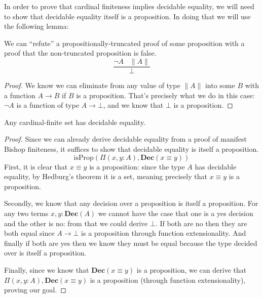 In order to prove that cardinal finiteness implies decidable equality, we will
need to show that decidable equality itself is a proposition.
In doing that we will use the following lemma:
\begin{lemma} \label{prop-refute}
  We can ``refute'' a propositionally-truncated proof of some proposition with a
  proof that the non-truncated proposition is false.
  \begin{equation}
    \frac{\neg A \; \; \; \lVert A \rVert}{\bot}
  \end{equation}
\end{lemma}
\begin{proof}
  We know we can eliminate from any value of type \(\lVert A \rVert\) into some
  \(B\) with a function \(A \to B\) if \(B\) is a proposition.
  That's precisely what we do in this case: \(\neg A\) is a function of type \(A
  \to \bot\), and we know that \(\bot\) is a proposition.
\end{proof}

\begin{lemma} \label{cardinal-finite-discrete}
  Any cardinal-finite set has decidable equality.
\end{lemma}
\begin{proof}
  Since we can already derive decidable equality from a proof of manifest Bishop
  finiteness, it suffices to show that decidable equality is itself a
  proposition.
  \begin{equation}
    \text{isProp}(\Pi(x, y : A) , \mathbf{Dec}(x \equiv y))
  \end{equation}
  First, it is clear that \(x \equiv y\) is a proposition: since the type \(A\)
  has decidable equality, by Hedburg's theorem it is a set,
  meaning precisely that \(x \equiv y\) is a proposition.

  Secondly, we know that any decision over a proposition is itself a
  proposition.
  For any two terms \(x, y: \mathbf{Dec}(A)\) we cannot have the case that one
  is a yes decision and the other is no: from that we could derive \(\bot\).
  If both are no then they are both equal since \(A \rightarrow \bot\) is a
  proposition through function extensionality.
  And finally if both are yes then we know they must be equal because the type
  decided over is itself a proposition.

  Finally, since we know that \(\mathbf{Dec}(x \equiv y)\) is a proposition, we
  can derive that \(\Pi(x, y : A) , \mathbf{Dec}(x \equiv y)\) is a proposition
  (through function extensionality), proving our goal.
\end{proof}
